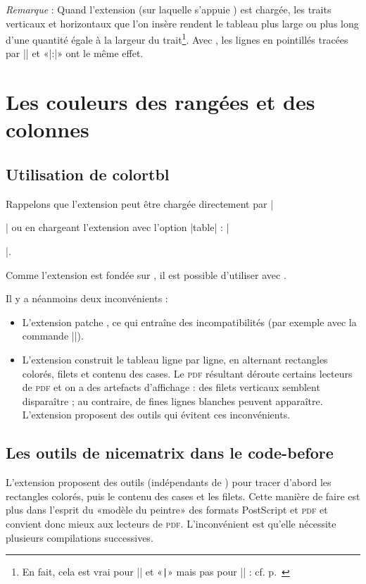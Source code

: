 \documentclass[dvipsnames]{article}%
\begin{document}
\bigskip
\emph{Remarque} : Quand l'extension  (sur laquelle s'appuie
) est chargée, les traits verticaux et horizontaux que l'on
insère rendent le tableau plus large ou plus long d'une quantité égale à la
largeur du trait\footnote{En fait, cela est vrai pour |\hline| et «\verb+|+»
  mais pas pour |\cline| : cf. p.~\pageref{remark-cline}}. Avec
, les lignes en pointillés tracées par |\hdottedline| et «|:|»
ont le même effet.




\section{Les couleurs des rangées et des colonnes}

\subsection{Utilisation de colortbl}

Rappelons que l'extension  peut être chargée directement par
|\usepackage{colortbl}| ou en chargeant l'extension  avec l'option
|table| : |\usepackage[table]{xcolor}|.

\medskip
Comme l'extension  est fondée sur , il est possible
d'utiliser  avec .

\medskip
Il y a néanmoins deux inconvénients :
\begin{itemize}
\item L'extension  patche , ce qui entraîne des
incompatibilités (par exemple avec la commande |\hdotsfor|).

\item L'extension  construit le tableau ligne par ligne, en
alternant rectangles colorés, filets et contenu des cases. Le \textsc{pdf}
résultant déroute certains lecteurs de \textsc{pdf} et on a des artefacts
d'affichage : des filets verticaux semblent disparaître ; au contraire, de fines
lignes blanches peuvent apparaître. L'extension  proposent des
outils qui évitent ces inconvénients.
\end{itemize}

\subsection{Les outils de nicematrix dans le code-before}

L'extension  proposent des outils (indépendants de
) pour tracer d'abord les rectangles colorés, puis le contenu des
cases et les filets. Cette manière de faire est plus dans l'esprit du «modèle du
peintre» des formats PostScript et \textsc{pdf} et convient donc mieux aux
lecteurs de \textsc{pdf}. L'inconvénient est qu'elle nécessite plusieurs
compilations successives.
\end{document}
